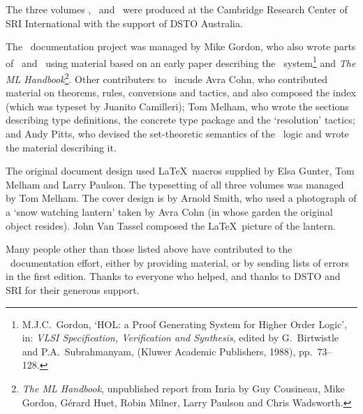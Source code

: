 The three volumes \TUTORIAL, \DESCRIPTION\ and \REFERENCE\ were
produced at the Cambridge Research Center of SRI International with
the support of DSTO Australia.

The \HOL\ documentation project was managed by Mike Gordon, who also
wrote parts of \DESCRIPTION\ and \TUTORIAL\ using material based on an
early paper describing the \HOL\ system\footnote{M.J.C.\ Gordon, `HOL:
  a Proof Generating System for Higher Order Logic', in: {\it VLSI
    Specification, Verification and Synthesis\/}, edited by G.\
  Birtwistle and P.A.\ Subrahmanyam, (Kluwer Academic Publishers,
  1988), pp.\ 73--128.} and {\sl The ML Handbook\/}\footnote{{\sl The
    ML Handbook}, unpublished report from Inria by Guy Cousineau, Mike
  Gordon, G\'erard Huet, Robin Milner, Larry Paulson and Chris
  Wadsworth.}.  Other contributers to \DESCRIPTION\ incude Avra Cohn,
who contributed material on theorems, rules, conversions and tactics,
and also composed the index (which was typeset by Juanito Camilleri);
Tom Melham, who wrote the sections describing type definitions, the
concrete type package and the `resolution' tactics; and Andy Pitts,
who devised the set-theoretic semantics of the \HOL\ logic and wrote
the material describing it.

The original document design used \LaTeX\ macros supplied by Elsa
Gunter, Tom Melham and Larry Paulson.  The typesetting of all three
volumes was managed by Tom Melham.  The cover design is by Arnold
Smith, who used a photograph of a `snow watching lantern' taken by
Avra Cohn (in whose garden the original object resides).  John Van
Tassel composed the \LaTeX\ picture of the lantern.

Many people other than those listed above have contributed to the
\HOL\ documentation effort, either by providing material, or by
sending lists of errors in the first edition.  Thanks to everyone who
helped, and thanks to DSTO and SRI for their generous support.






